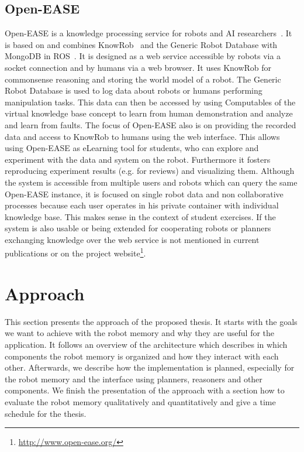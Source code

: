 \documentclass[a4paper,11pt]{article}
\begin{document}
\subsection{Open-EASE}
\label{sec:openease}
Open-EASE is a knowledge processing service for robots and AI
researchers~\cite{OpenEASE}. It is based on and combines
KnowRob~\cite{KnowRob} and the Generic Robot Database with MongoDB in
ROS~\cite{RoboDB}. It is designed as a web service accessible by
robots via a socket connection and by humans via a web browser. It
uses KnowRob for commonsense reasoning and storing the world model of
a robot. The Generic Robot Database is used to log data about robots
or humans performing manipulation tasks. This data can then be
accessed by using Computables of the virtual knowledge base concept to
learn from human demonstration and analyze and learn from faults. The
focus of Open-EASE also is on providing the recorded data and access
to KnowRob to humans using the web interface. This allows using
Open-EASE as eLearning tool for students, who can explore and
experiment with the data and system on the robot. Furthermore it
fosters reproducing experiment results (e.g. for reviews) and
visualizing them. Although the system is accessible from multiple
users and robots which can query the same Open-EASE instance, it is
focused on single robot data and non collaborative processes because
each user operates in his private container with individual knowledge
base. This makes sense in the context of student exercises. If the
system is also usable or being extended for cooperating robots or
planners exchanging knowledge over the web service is not mentioned in
current publications or on the project
website\footnote{\url{http://www.open-ease.org/}}.


\section{Approach}
\label{sec:approach}
This section presents the approach of the proposed thesis. It starts
with the goals we want to achieve with the robot memory and why they
are useful for the application. It follows an overview of the
architecture which describes in which components the robot memory is
organized and how they interact with each other. Afterwards, we
describe how the implementation is planned, especially for the robot
memory and the interface using planners, reasoners and other
components. We finish the presentation of the approach with a section
how to evaluate the robot memory qualitatively and quantitatively and
give a time schedule for the thesis.
\end{document}
